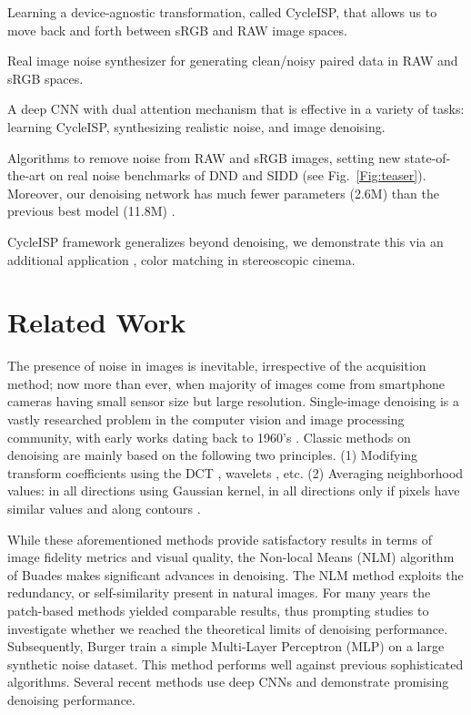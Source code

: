 \documentclass[10pt,twocolumn,letterpaper]{article}
\begin{document}
\begin{compactitem}
    \item Learning a device-agnostic transformation, called CycleISP, that allows us to move back and forth between sRGB and RAW image spaces.
    \item Real image noise synthesizer for generating clean/noisy paired data in RAW and sRGB spaces. 
    \item A deep CNN with dual attention mechanism that is effective in a variety of tasks: learning CycleISP, synthesizing realistic noise, and image denoising.
    \item Algorithms to remove noise from RAW and sRGB images, setting new state-of-the-art on real noise benchmarks of DND \cite{dnd} and SIDD \cite{sidd} (see Fig.~\ref{Fig:teaser}). Moreover, our denoising network  has much fewer parameters (2.6M) than the previous best model (11.8M) \cite{Brooks2019}.
    \item CycleISP framework generalizes beyond denoising, we demonstrate this via an additional application \ie, color matching in stereoscopic cinema.
\end{compactitem}

\section{Related Work}
The presence of noise in images is inevitable, irrespective of the acquisition method; now more than ever, when majority of images come from smartphone cameras having small sensor size but large resolution. 
Single-image denoising is a vastly researched problem in the computer vision and image processing community, with early works dating back to 1960's \cite{bertalmio2018denoising}.
Classic methods on denoising are mainly based on the following two principles. (1) Modifying transform coefficients using the DCT \cite{yaroslavsky1996local}, wavelets \cite{donoho1995noising,simoncelli1996noise}, etc. (2) Averaging neighborhood values: in all directions using Gaussian kernel, in all directions only if pixels have similar values \cite{smith1997susan,tomasi1998bilateral} and along contours \cite{perona1990scale,rudin1992nonlinear}.

While these aforementioned methods provide satisfactory results 
in terms of image fidelity metrics and visual quality, the Non-local Means (NLM) algorithm of Buades \etal \cite{NLM} makes significant advances in denoising.
The NLM method exploits the redundancy, or self-similarity \cite{efros1999texture} present in natural images.
For many years the patch-based methods yielded comparable results, thus prompting studies \cite{chatterjee2009denoising,chatterjee2010fundamental,levin2011natural} to investigate whether we reached the theoretical limits of denoising performance. 
Subsequently, Burger \etal \cite{MLP} train a  simple Multi-Layer Perceptron (MLP) on a large synthetic noise dataset.
This method performs well against previous sophisticated algorithms. 
Several recent methods use deep CNNs \cite{RIDNet,Brooks2019,Gharbi2016,CBDNet,N3Net,DnCNN,FFDNetPlus,ntire2019denoising} and demonstrate promising denoising performance. 
\end{document}
